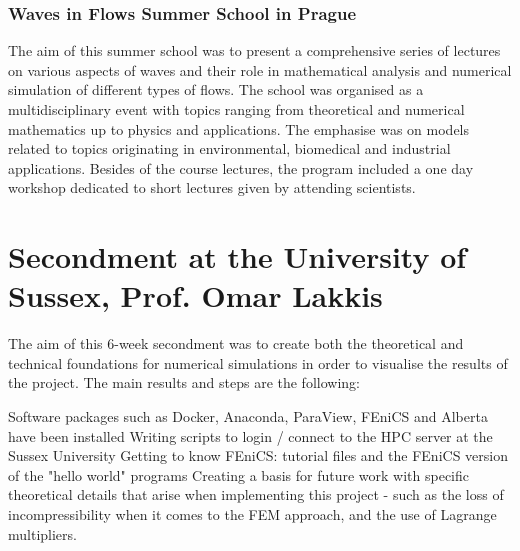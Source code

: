 \documentclass{article}
\begin{document}
\subsubsection{Waves in Flows Summer School in Prague}

The aim of this summer school was to present a comprehensive series of lectures on various aspects of waves and their role in mathematical analysis and numerical simulation of different types of flows. The school was organised as a multidisciplinary event with topics ranging from theoretical and numerical mathematics up to physics and applications. The emphasise was on models related to topics originating in environmental, biomedical and industrial applications. Besides of the course lectures, the program included a one day workshop dedicated to short lectures given by attending scientists.

\section{Secondment at the University of Sussex, Prof. Omar Lakkis}

The aim of this 6-week secondment was to create both the theoretical and technical foundations for numerical simulations in order to visualise the results of the project. The main results and steps are the following:

\begin{outline}[enumerate]

\1 Software packages such as Docker, Anaconda, ParaView, FEniCS and Alberta have been installed
\1 Writing scripts to login / connect to the HPC server at the Sussex University
\1 Getting to know FEniCS: tutorial files and the FEniCS version of the "hello world" programs
\1 Creating a basis for future work with specific theoretical details that arise when implementing this project - such as the loss of incompressibility when it comes to the FEM approach, and the use of Lagrange multipliers.

\end{outline}

\nocite{*}


\end{document}
